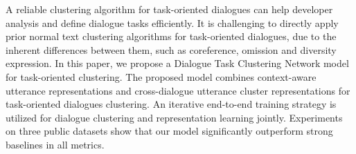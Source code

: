 A reliable clustering algorithm for task-oriented dialogues can help developer analysis and define dialogue tasks efficiently. It is challenging to directly apply prior normal text clustering algorithms for task-oriented dialogues, due to the inherent differences between them, such as coreference, omission and diversity expression. In this paper, we propose a Dialogue Task Clustering Network model for task-oriented clustering. The proposed model combines context-aware utterance representations and cross-dialogue utterance cluster representations for task-oriented dialogues clustering. An iterative end-to-end training strategy is utilized for dialogue clustering and representation learning jointly. Experiments on three public datasets show that our model significantly outperform strong baselines in all metrics.
